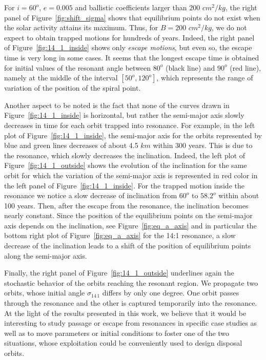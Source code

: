 \documentclass[12pt,reqno]{amsart}
\numberwithin{equation}{section}
\begin{document}
For $i=60^o$, $e=0.005$ and ballistic coefficients larger than $200$ $cm^2/kg$, the right panel of Figure~\ref{fig:shift_sigma} shows that equilibrium points do not exist when the solar activity attains its maximum. Thus, for $B=200$ $cm^2/kg$, we do not expect to obtain trapped motions for hundreds of years. Indeed, the right panel of Figure~\ref{fig:14_1_inside} shows only {\it escape motions}, but even so, the escape time is very long in some cases.
It seems that the longest escape time is obtained for initial values of the resonant angle between $80^o$ (black line)  and $90^o$ (red line), namely at the middle of the interval $[50^o, 120^o]$, which represents the range of variation of the position of
the spiral point.

Another aspect to be noted is the fact that none of the curves drawn in Figure~\ref{fig:14_1_inside} is horizontal, but rather the semi-major axis slowly decreases in time for each orbit trapped into resonance.
For example, in the left plot of Figure~\ref{fig:14_1_inside}, the semi-major axis for the orbits represented by blue and green lines
decreases of about 4.5 $km$ within 300 years. This is due to the resonance, which slowly decreases the inclination. Indeed, the left plot of Figure~\ref{fig:14_1_outside} shows the
evolution of the inclination for the same orbit for which the variation of the semi-major axis is represented in red color in the left panel of Figure~\ref{fig:14_1_inside}.
For the trapped motion inside the resonance we notice a slow decrease of inclination from $60^o$ to $58.2^o$ within
about 100 years. Then, after the escape from the resonance, the inclination becomes nearly constant. Since the position of the equilibrium points on the semi-major axis  depends on the
inclination, see Figure~\ref{fig:eq_a_axis} and in particular the bottom right plot of Figure~\ref{fig:eq_a_axis} for the 14:1 resonance, a slow decrease of the inclination leads to a shift  of the position of equilibrium points along the semi-major axis.

Finally, the right panel of Figure~\ref{fig:14_1_outside} underlines again the stochastic behavior of the orbits reaching the resonant region. We propagate two orbits, whose initial angle $\sigma_{1\!4 \,  1}$ differs by only one degree. One orbit passes through the resonance and the other is
captured temporarily into the resonance.
At the light of the results presented in this work, we believe that it would be interesting to study passage or escape from
resonances in specific case studies as well as to move parameters or initial conditions to foster one
of the two situations, whose exploitation could be conveniently used to design disposal orbits.
\end{document}

